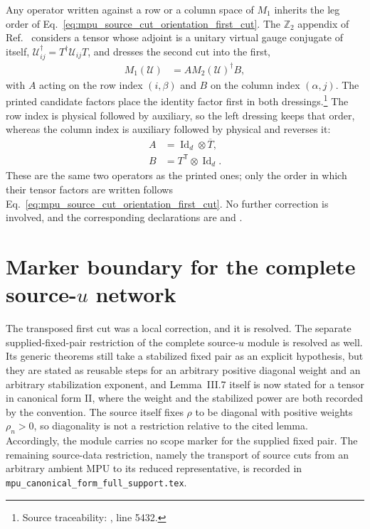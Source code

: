 \documentclass{article}
\begin{document}
Any operator written against a row or a column space of $M_1$ inherits the leg
order of Eq.~\ref{eq:mpu_source_cut_orientation_first_cut}. The
$\mathbb Z_2$ appendix of Ref.~\cite{FrancoRubio2025MPUGauging} considers a
tensor whose adjoint is a unitary virtual gauge conjugate of itself,
$\mathcal U^\dagger_{ij}=T^\dagger\mathcal U_{ij}T$, and dresses the second cut
into the first,
\begin{align}
    M_1(\mathcal U)
     & =AM_2(\mathcal U)^\dagger B,
    \label{eq:mpu_source_cut_orientation_dressed_cut}
\end{align}
with $A$ acting on the row index $(i,\beta)$ and $B$ on the column index
$(\alpha,j)$. The printed candidate factors place the identity factor first in
both dressings.\footnote{Source traceability:
    , line 5432.} The row index is physical
followed by auxiliary, so the left dressing keeps that order, whereas the
column index is auxiliary followed by physical and reverses it:
\begin{align}
    A
     & =\operatorname{Id}_d\otimes\overline T,
    \label{eq:mpu_source_cut_orientation_left_dressing} \\
    B
     & =T^{\mathsf T}\otimes\operatorname{Id}_d.
    \label{eq:mpu_source_cut_orientation_right_dressing}
\end{align}
These are the same two operators as the printed ones; only the order in which
their tensor factors are written follows
Eq.~\ref{eq:mpu_source_cut_orientation_first_cut}. No further correction is
involved, and the corresponding declarations are
 and
.

\section{Marker boundary for the complete source-$u$ network}

The transposed first cut was a local correction, and it is resolved. The
separate supplied-fixed-pair restriction of the complete source-$u$ module is
resolved as well. Its generic theorems still take a stabilized fixed pair as an
explicit hypothesis, but they are stated as reusable steps for an arbitrary
positive diagonal weight and an arbitrary stabilization exponent, and
Lemma~III.7 itself is now stated for a tensor in canonical form II, where the
weight and the stabilized power are both recorded by the convention. The source
itself fixes $\rho$ to be diagonal with positive weights $\rho_n>0$, so
diagonality is not a restriction relative to the cited lemma.
Accordingly, the module carries no scope marker for the supplied fixed pair.
The remaining source-data restriction, namely the transport of source cuts from
an arbitrary ambient MPU to its reduced representative, is recorded in
\texttt{mpu\_canonical\_form\_full\_support.tex}.
\end{document}
